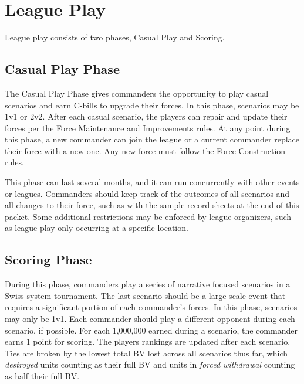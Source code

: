 \documentclass{article}
\begin{document}
\newpage

\section{League Play}

League play consists of two phases, Casual Play and Scoring.

\subsection{Casual Play Phase}

The Casual Play Phase gives commanders the opportunity to play casual scenarios and earn C-bills to upgrade their forces.
In this phase, scenarios may be 1v1 or 2v2.
After each casual scenario, the players can repair and update their forces per the Force Maintenance and Improvements rules.
At any point during this phase, a new commander can join the league or a current commander replace their force with a new one.
Any new force must follow the Force Construction rules.

This phase can last several months, and it can run concurrently with other events or leagues.
Commanders should keep track of the outcomes of all scenarios and all changes to their force, such as with the sample record sheets at the end of this packet.
Some additional restrictions may be enforced by league organizers, such as league play only occurring at a specific location.

\subsection{Scoring Phase}

During this phase, commanders play a series of narrative focused scenarios in a Swiss-system tournament.
The last scenario should be a large scale event that requires a significant portion of each commander's forces.
In this phase, scenarios may only be 1v1.
Each commander should play a different opponent during each scenario, if possible.
For each 1,000,000 earned during a scenario, the commander earns 1 point for scoring.
The players rankings are updated after each scenario.
Ties are broken by the lowest total BV lost across all scenarios thus far, which \emph{destroyed} units counting as their full BV and units in \emph{forced withdrawal} counting as half their full BV.
\end{document}
